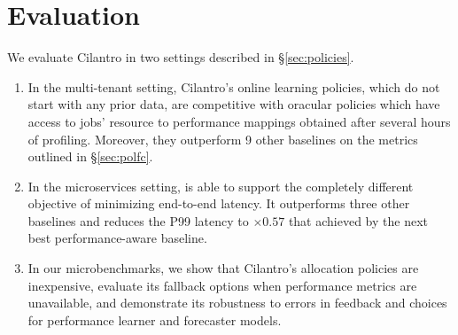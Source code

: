 


\insertFigProfiling
\section{Evaluation}
\label{sec:experiments}

We evaluate Cilantro in two settings described in \S\ref{sec:policies}.
\vspace{-0.05in}
\begin{enumerate}
    \item In the multi-tenant setting, Cilantro's online learning policies,
        which do not start with any prior data, are
    competitive with  oracular policies which have access to jobs' resource to
    performance mappings
    obtained after several hours of profiling.
    Moreover, they outperform 9 other baselines on the metrics outlined in \S\ref{sec:polfc}.
\vspace{-0.05in}
    \item In the microservices setting, \cilantro{} is able to support the completely different
objective of minimizing end-to-end latency. It outperforms three other baselines
and reduces the P99 latency to $\times0.57$ that achieved by the next
best performance-aware baseline.
\vspace{-0.05in}
\item In our microbenchmarks, we show that Cilantro's allocation policies are inexpensive,
evaluate its fallback options when performance metrics are unavailable,
and demonstrate its robustness to errors in feedback and choices for
performance learner and forecaster models.
\end{enumerate}




